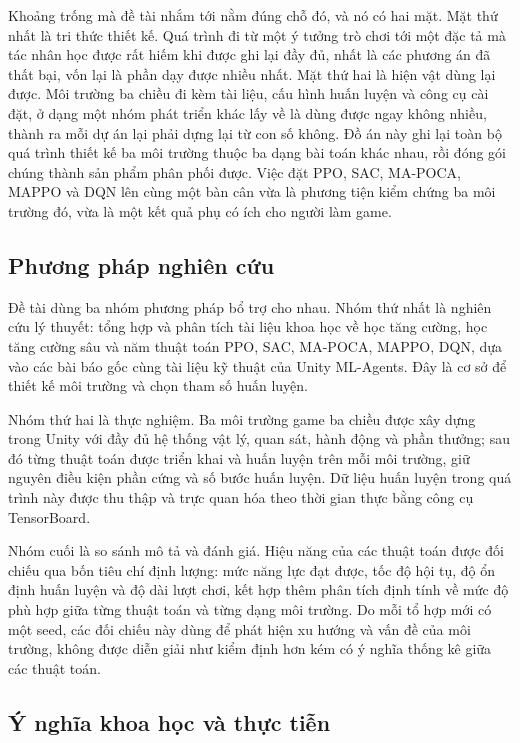 \indent Khoảng trống mà đề tài nhắm tới nằm đúng chỗ đó, và nó có hai mặt. Mặt thứ nhất
là tri thức thiết kế. Quá trình đi từ một ý tưởng trò chơi tới một đặc tả mà tác
nhân học được rất hiếm khi được ghi lại đầy đủ, nhất là các phương án đã thất bại, vốn
lại là phần dạy được nhiều nhất. Mặt thứ hai là hiện vật dùng lại được. Môi
trường ba chiều đi kèm tài liệu, cấu hình huấn luyện và công cụ cài đặt, ở dạng một nhóm
phát triển khác lấy về là dùng được ngay không nhiều, thành ra mỗi dự án lại
phải dựng lại từ con số không. Đồ án này ghi lại toàn bộ quá trình thiết
kế ba môi trường thuộc ba dạng bài toán khác nhau, rồi đóng gói chúng thành sản phẩm phân
phối được. Việc đặt PPO, SAC, MA-POCA, MAPPO và DQN lên cùng một bàn cân vừa là phương tiện kiểm chứng ba môi trường đó, vừa là một kết quả phụ có ích cho người làm game.

\subsection{Phương pháp nghiên cứu}
\indent Đề tài dùng ba nhóm phương pháp bổ trợ cho nhau. Nhóm thứ nhất là nghiên cứu lý thuyết: tổng hợp và phân tích tài liệu khoa học về học tăng cường, học tăng cường sâu và
năm thuật toán PPO, SAC, MA-POCA, MAPPO, DQN, dựa vào các bài báo gốc cùng tài liệu kỹ
thuật của Unity ML-Agents. Đây là cơ sở để thiết kế môi trường và chọn tham số huấn luyện.

\indent Nhóm thứ hai là thực nghiệm. Ba môi trường game ba chiều được xây dựng trong Unity
với đầy đủ hệ thống vật lý, quan sát, hành động và phần thưởng; sau đó từng thuật toán
được triển khai và huấn luyện trên mỗi môi trường, giữ nguyên điều kiện phần cứng và số
bước huấn luyện. Dữ liệu huấn luyện trong quá trình này được thu thập và trực quan hóa
theo thời gian thực bằng công cụ TensorBoard.

\indent Nhóm cuối là so sánh mô tả và đánh giá. Hiệu năng của các thuật toán được đối chiếu qua
bốn tiêu chí định lượng: mức năng lực đạt được, tốc độ hội tụ, độ ổn định huấn luyện và
độ dài lượt chơi, kết hợp thêm phân tích định tính về mức độ phù hợp giữa từng thuật
toán và từng dạng môi trường. Do mỗi tổ hợp mới có một seed, các đối chiếu này dùng để
phát hiện xu hướng và vấn đề của môi trường, không được diễn giải như kiểm định hơn kém
có ý nghĩa thống kê giữa các thuật toán.

\subsection{Ý nghĩa khoa học và thực tiễn}

